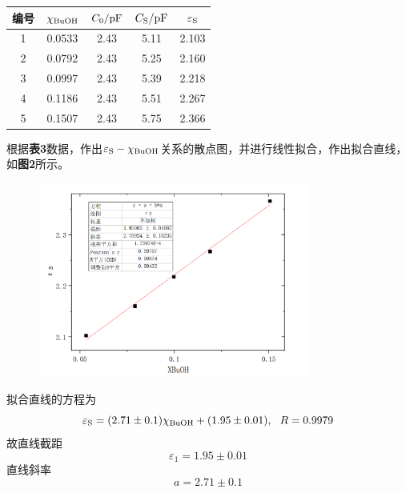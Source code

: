 \documentclass[12pt]{article}
\begin{document}
			\begin{table}[h]
				\centering
				\begin{tabular}{ccccc}
					\toprule
					编号 & $\chi_{\rm BuOH}$ & $C_{0}/{\rm pF}$ & $C_{\rm S}/{\rm pF}$ & $\varepsilon_{\rm S}$ \\
					\midrule
					1 & 0.0533 & 2.43 & 5.11 & 2.103 \\
					2 & 0.0792 & 2.43 & 5.25 & 2.160 \\
					3 & 0.0997 & 2.43 & 5.39 & 2.218 \\
					4 & 0.1186 & 2.43 & 5.51 & 2.267 \\
					5 & 0.1507 & 2.43 & 5.75 & 2.366 \\
					\bottomrule
				\end{tabular}
			\end{table}
			\par
			根据\textbf{表3}数据，作出$\varepsilon_{\rm S}-\chi_{\rm BuOH}$关系的散点图，并进行线性拟合，作出拟合直线，如\textbf{图2}所示。
			\begin{figure}[h]
				\centering
				\includegraphics[width=0.8\textwidth]{2.png}
			\end{figure}
			\par
			拟合直线的方程为
			$$
			\varepsilon_{\rm S}=(2.71\pm 0.1)\chi_{\rm BuOH}+(1.95\pm 0.01),\  \ R=0.9979
			$$
			故直线截距
			$$\varepsilon_{1}=1.95\pm 0.01$$
			直线斜率
			$$a=2.71\pm 0.1$$
			\par
\end{document}
